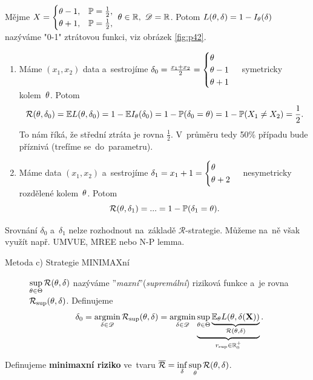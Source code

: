 \begin{example} \label{example:problemy}
	Mějme $X=\begin{cases}
	\theta-1,& \mathbb{P}=\frac{1}{2}, \\ \theta+1,& \mathbb{P}=\frac{1}{2},
	\end{cases}~\theta\in\mathbb{R},~\mathscr{D}=\mathbb{R}$. Potom
	$ L(\theta,\delta)=1-I_\theta(\delta)$ nazýváme "0-1" ztrátovou funkci, viz obrázek \ref{fig:p42}.
	
	
	
	\begin{enumerate}[1)]
		\item Máme $(x_1,x_2)$ data a~sestrojíme $\delta_0=\frac{x_1+x_2}{2}=\begin{cases}
		\theta\\\theta-1\\\theta+1
		\end{cases}$ symetricky kolem~$\theta$. Potom
		$$ \mathcal{R}(\theta,\delta_0)=\mathbb{E} L(\theta,\delta_0)=1-\mathbb{E} I_\theta(\delta_0)=1-\mathbb{P}(\delta_0=\theta)=1-\mathbb{P}(X_1\neq X_2)=\frac{1}{2}.$$ To nám říká, že střední ztráta je rovna $\frac{1}{2}$. V~průměru tedy 50\% případu bude příznivá (trefíme se~do~parametru).
		\item Máme data $(x_1,x_2)$ a~sestrojíme $\delta_1=x_1+1=\begin{cases}
		\theta\\\theta+2
		\end{cases}$ nesymetricky rozdělené kolem~$\theta$. Potom
		$$\mathcal{R}(\theta,\delta_1)=...=1-\mathbb{P}(\delta_1=\theta).$$
	\end{enumerate}
Srovnání $\delta_0$ a~$\delta_1$ nelze rozhodnout na~základě $\mathcal{R}$-strategie. Můžeme na~ně však využít např. UMVUE, MREE nebo N-P lemma.
\end{example}
\begin{description}
	\item[Metoda c) Strategie MINIMAXní] $\sup\limits_{\theta\in\Theta} \mathcal{R}(\theta,\delta)$ nazýváme ''\textit{maxní}''(\textit{supremální}) riziková funkce a~je rovna $\mathcal{R}_{\sup}(\theta,\delta)$. Definujeme 
	$$ \delta_0=\mathop{\mathrm{argmin}}\limits_{\delta\in\mathscr{D}}\mathcal{R}_{\sup}(\theta,\delta)=\mathop{\mathrm{argmin}}\limits_{\delta\in\mathscr{D}}\underbrace{\sup\limits_{\theta\in\Theta}\underbrace{\mathbb{E}_\theta L(\theta,\delta(\textbf{X}))}_{\mathcal{R}(\theta,\delta)}}_{r_{\sup}\in\mathbb{R}_0^+}.$$
\end{description}

\begin{define}
	Definujeme \textbf{minimaxní riziko} ve~tvaru $\overline{\mathcal{R}}=\inf\limits_\delta\sup\limits_\theta\mathcal{R}(\theta,\delta)$.
\end{define}

